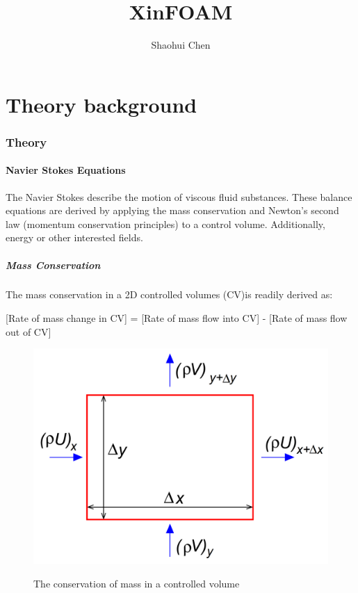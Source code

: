 \documentclass{article}
\title{XinFOAM}
\author{Shaohui Chen}
\begin{document}
\maketitle
\tableofcontents
\newpage
\part{Theory background}
\section{Theory}
\subsection{Navier Stokes Equations}

The Navier Stokes describe the motion of viscous fluid substances. These balance equations are derived by applying the mass conservation and Newton's second law (momentum conservation principles) to a control volume. Additionally, energy or other interested fields. 

\subsubsection{Mass Conservation}

The mass conservation in a 2D controlled volumes (CV)is readily derived as: 

[Rate of mass change in CV] = [Rate of mass flow into CV] - [Rate of mass flow out of CV]

\begin{figure}[h!]
\centering
\includegraphics[scale=0.15]{ns 2D mas sketch.PNG}
\label{fig:ns 2D mas sketch.PNG}
\caption{The conservation of mass in a controlled volume}
\end{figure}
\end{document}
